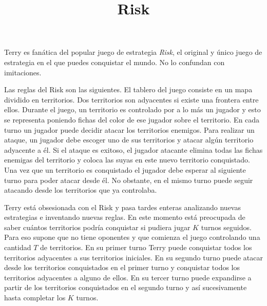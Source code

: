 \documentclass{oci}
\title{Risk}
\begin{document}
\begin{problemDescription}
%

  Terry es fanática del popular juego de estrategia \emph{Risk}, el original 
  y único juego de estrategia en el que puedes conquistar el mundo. No lo confundan con imitaciones.

  Las reglas del Risk son las siguientes.
  El tablero del juego consiste en un mapa dividido en territorios.
  Dos territorios son adyacentes si existe una frontera entre ellos. 
  Durante el juego, un territorio es controlado por a lo más un jugador %
  y esto se representa poniendo %
  fichas del color de ese jugador sobre el territorio. 
  En cada turno un jugador puede decidir atacar los territorios enemigos.
  Para realizar un ataque, un jugador debe escoger uno de sus territorios y
  atacar algún territorio adyacente a él.
  Si el ataque es exitoso, el jugador atacante elimina todas las fichas enemigas
  del territorio y coloca las suyas en este nuevo territorio conquistado.
  Una vez que un territorio es conquistado el jugador debe esperar al siguiente
  turno para poder atacar desde él.
  No obstante, en el mismo turno puede seguir atacando desde los territorios que
  ya controlaba.

  Terry está obsesionada con el Risk y pasa tardes enteras analizando
  nuevas estrategias e inventando nuevas reglas.
  En este momento está preocupada de saber cuántos territorios podría
  conquistar si pudiera jugar $K$ turnos seguidos.
  Para eso supone que no tiene oponentes y que comienza el juego controlando una
  cantidad $T$ de territorios.
  En su primer turno Terry puede conquistar todos los territorios adyacentes a
  sus territorios iniciales.
  En su segundo turno puede atacar desde los territorios conquistados en
  el primer turno y conquistar todos los territorios adyacentes a alguno de
  ellos.
  En su tercer turno puede expandirse a partir de los territorios
  conquistados en el segundo turno y así sucesivamente hasta completar los $K$
  turnos.
  

\end{problemDescription}
\end{document}

